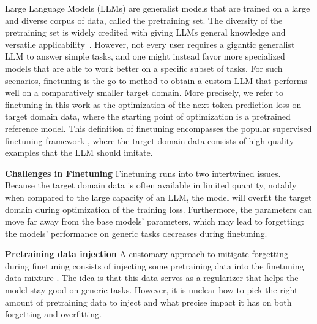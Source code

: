 Large Language Models (LLMs) are generalist models that are trained on a large and diverse corpus of data, called the pretraining set.
The diversity of the pretraining set is widely credited with giving LLMs general knowledge and versatile applicability~\citep{yu2024makes}.
However, not every user requires a gigantic generalist LLM to answer simple tasks, and one might instead favor more specialized models that are able to work better on a specific subset of tasks.
For such scenarios, finetuning is the go-to method to obtain a custom LLM that performs well on a comparatively smaller target domain.
More precisely, we refer to finetuning in this work as the optimization of the next-token-prediction loss on target domain data, where the starting point of optimization is a pretrained reference model.
This definition of finetuning encompasses the popular supervised finetuning framework \citep{ouyang2022training}, where the target domain data consists of high-quality examples that the LLM should imitate. 

\textbf{Challenges in Finetuning} 
Finetuning runs into two intertwined issues.
Because the target domain data is often available in limited quantity, notably when compared to the large capacity of an LLM, the model will overfit the target domain during optimization of the training loss. 
Furthermore, the parameters can move far away from the base models' parameters, which may lead to forgetting: the models' performance on generic tasks decreases during finetuning.

\textbf{Pretraining data injection}
A customary approach to mitigate forgetting during finetuning consists of injecting some pretraining data into the finetuning data mixture
\citep{liu2022improved,kang2024get,ibrahim2024simple}. 
The idea is that this data serves as a regularizer that helps the model stay good on generic tasks.
However, it is unclear how to pick the right amount of pretraining data to inject and what precise impact it has on both forgetting and overfitting.

